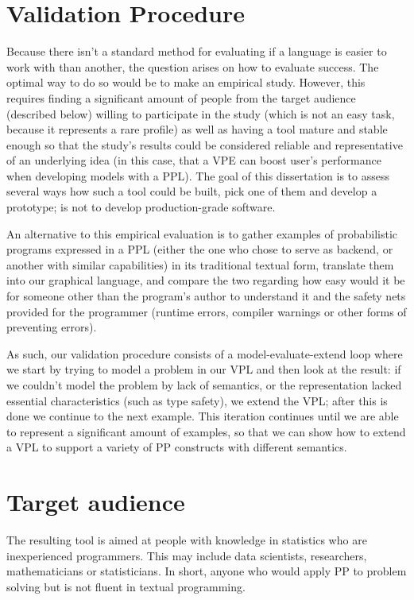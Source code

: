 \section{Validation Procedure}

Because there isn't a standard method for evaluating if a language is easier
to work with than another, the question arises on how to evaluate success.
The optimal way to do so would be to make an empirical
study. However, this requires finding a significant amount of people from the
target audience (described below) willing to participate in the study (which
is not an easy task, because it represents a rare profile) as well as having a tool mature and stable enough so that the
study's results could be considered reliable and representative of an underlying
idea (in this case, that a VPE can boost user's performance when developing
models with a PPL). The goal of this dissertation is to
assess several ways how such a tool could be built, pick one of them and develop
a prototype; is not to develop production-grade software.

An alternative to this empirical evaluation is to gather examples of probabilistic programs expressed in a
PPL (either the one who chose to serve as backend, or another with similar
capabilities) in its traditional textual form, translate them into our graphical
language, and compare the two regarding how easy would it be for someone other than
the program's author to understand it and the safety nets provided for the programmer
(runtime errors, compiler warnings or other forms of preventing errors).

As such, our validation procedure consists of a model-evaluate-extend loop where
we start by trying to model a problem in our VPL and then look at the result:
if we couldn't model the problem by lack of semantics, or the representation
lacked essential characteristics (such as type safety), we extend the VPL;
after this is done we continue to the next example. This iteration continues
until we are able to represent a significant amount of examples, so that
we can show how to extend a VPL to support a variety of PP constructs with different
semantics.

\section{Target audience}\label{sec:audience}

The resulting tool is aimed at people with knowledge in statistics
who are inexperienced programmers. This may include data scientists, researchers,
mathematicians or statisticians. In short, anyone who would apply PP to problem
solving but is not fluent in textual programming.

